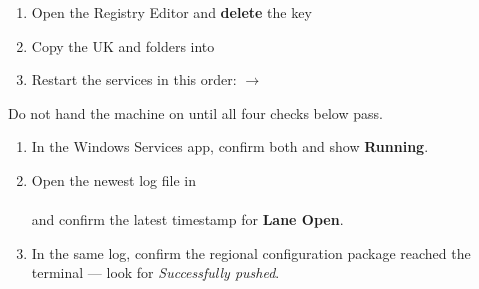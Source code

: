 \documentclass[a4paper,10pt]{article}
\begin{document}

\begin{enumerate}
  \item Open the Registry Editor and \textbf{delete} the key\\

  \item Copy the UK  and  folders into\\

  \item Restart the services in this order:
         $\rightarrow$ 
\end{enumerate}

\label{sec:verify}

Do not hand the machine on until all four checks below pass.

\begin{enumerate}
  \item In the Windows Services app, confirm both
         and 
        show \textbf{Running}.

  \item Open the newest log file in\\
        \\
        and confirm the latest timestamp for \textbf{Lane Open}.

  \item In the same log, confirm the regional configuration package
        reached the terminal --- look for \emph{Successfully pushed}.
\end{enumerate}

\end{document}
